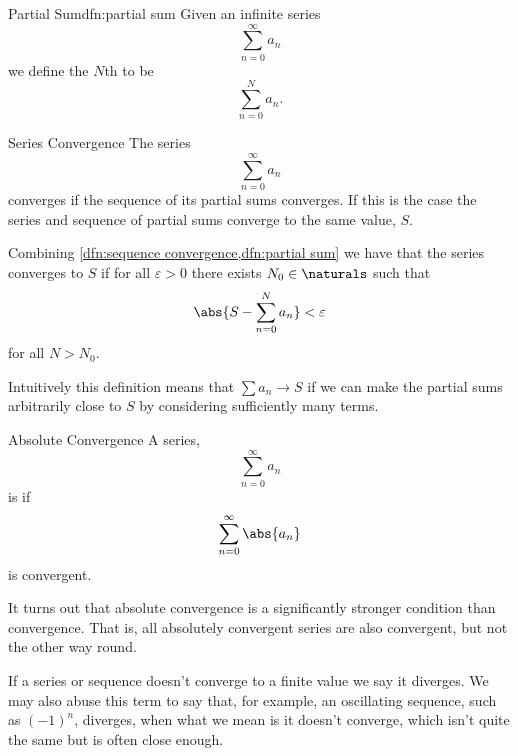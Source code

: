 \documentclass[fleqn]{NotesClass}
\begin{document}
    \begin{dfn}{Partial Sum}{dfn:partial sum}
        Given an infinite series
        \begin{equation}
            \sum_{n=0}^{\infty} a_n
        \end{equation}
        we define the \(N\)th  to be
        \begin{equation}
            \sum_{n=0}^{N}a_n.
        \end{equation}
    \end{dfn}
    
    \begin{dfn}{Series Convergence}{}
        The series
        \begin{equation}
            \sum_{n=0}^{\infty} a_n
        \end{equation}
        converges if the sequence of its partial sums converges.
        If this is the case the series and sequence of partial sums converge to the same value, \(S\).
        
        Combining \cref{dfn:sequence convergence,dfn:partial sum} we have that the series converges to \(S\) if for all \(\varepsilon>0\) there exists \(N_0\in\naturals\) such that
        \begin{equation}
            \abs{S - \sum_{n=0}^{N}a_n} < \varepsilon
        \end{equation}
        for all \(N > N_0\).
    \end{dfn}
    Intuitively this definition means that \(\sum a_n \to S\) if we can make the partial sums arbitrarily close to \(S\) by considering sufficiently many terms.
    
    \begin{dfn}{Absolute Convergence}{}
        A series,
        \begin{equation}
            \sum_{n=0}^{\infty} a_n
        \end{equation}
        is  if
        \begin{equation}
            \sum_{n=0}^{\infty} \abs{a_n}
        \end{equation}
        is convergent.
    \end{dfn}
    It turns out that absolute convergence is a significantly stronger condition than convergence.
    That is, all absolutely convergent series are also convergent, but not the other way round.
    
    If a series or sequence doesn't converge to a finite value we say it diverges.
    We may also abuse this term to say that, for example, an oscillating sequence, such as \((-1)^{n}\), diverges, when what we mean is it doesn't converge, which isn't quite the same but is often close enough.
    
\end{document}
